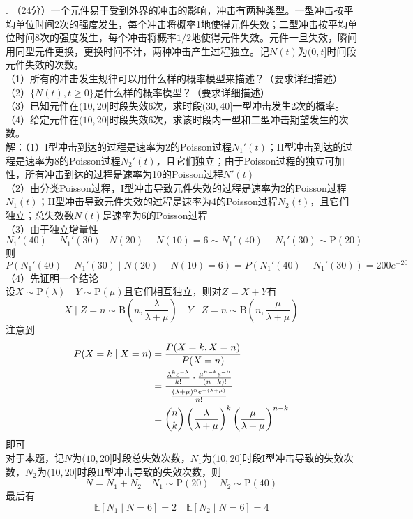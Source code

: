 \documentclass[UTF8]{ctexart}
\begin{document}
. （24分）一个元件易于受到外界的冲击的影响，冲击有两种类型。一型冲击按平均单位时间2次的强度发生，每个冲击将概率1地使得元件失效；二型冲击按平均单位时间8次的强度发生，每个冲击将概率$1/2$地使得元件失效。元件一旦失效，瞬间用同型元件更换，更换时间不计，两种冲击产生过程独立。记$N(t)$为$(0,t]$时间段元件失效的次数。\\
（1）所有的冲击发生规律可以用什么样的概率模型来描述？（要求详细描述）\\
（2）$\{N(t), t \geq 0\}$是什么样的概率模型？（要求详细描述）\\
（3）已知元件在$(10,20]$时段失效6次，求时段$(30,40]$一型冲击发生2次的概率。\\
（4）给定元件在$(10,20]$时段失效6次，求该时段内一型和二型冲击期望发生的次数。\\
解：（1）I型冲击到达的过程是速率为2的Poisson过程$N_1'(t)$；II型冲击到达的过程是速率为8的Poisson过程$N_2'(t)$，且它们独立；由于Poisson过程的独立可加性，所有冲击到达的过程是速率为10的Poisson过程$N'(t)$\\
（2）由分类Poisson过程，I型冲击导致元件失效的过程是速率为2的Poisson过程$N_1(t)$；II型冲击导致元件失效的过程是速率为4的Poisson过程$N_2(t)$，且它们独立；总失效数$N(t)$是速率为6的Poisson过程\\
（3）由于独立增量性
\[
N_1'(40)-N_1'(30)\mid N(20)-N(10)=6 \sim N_1'(40)-N_1'(30) \sim \mathrm{P}(20)
\]
则
\[
P(N_1'(40)-N_1'(30)\mid N(20)-N(10)=6)=P(N_1'(40)-N_1'(30))=200e^{-20}
\]
（4）先证明一个结论\\
设$X\sim \mathrm{P}(\lambda)\quad Y\sim \mathrm{P}(\mu)$且它们相互独立，则对$Z=X+Y$有
\[
X\mid Z=n \sim \mathrm{B}\left(n,\frac{\lambda}{\lambda+\mu} \right) \quad  Y\mid Z=n \sim \mathrm{B}\left(n,\frac{\mu}{\lambda+\mu} \right)
\]
注意到
\begin{align*}
	P(X=k\mid X=n) & = \frac{P(X=k,X=n)}{P(X=n)} \\
	 & =\frac{\frac{\lambda^k e^{-\lambda}}{k!}\cdot \frac{\mu^{n-k}e^{-\mu}}{(n-k)!}}{\frac{(\lambda+\mu)^n e^{-(\lambda+\mu)}}{n!}}\\
	 &= \dbinom{n}{k} \left(\frac{\lambda}{\lambda+\mu} \right)^k \left(\frac{\mu}{\lambda+\mu} \right)^{n-k}  
\end{align*}
即可\\
对于本题，记$N$为$(10,20]$时段总失效次数，$N_1$为$(10,20]$时段I型冲击导致的失效次数，$N_2$为$(10,20]$时段II型冲击导致的失效次数，则
\[
N=N_1+N_2 \quad N_1\sim \mathrm{P}(20) \quad N_2\sim \mathrm{P}(40)
\]
最后有
\[
\mathbb{E}[N_1\mid N=6]=2 \quad \mathbb{E}[N_2\mid N=6]=4
\]\\
\end{document}
